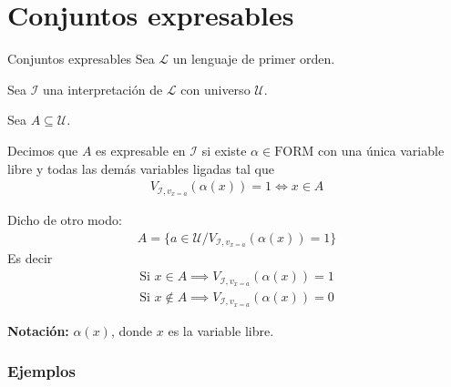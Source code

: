 \section{Conjuntos expresables}

\begin{definicion}{Conjuntos expresables}{}
    Sea $\mathcal{L}$ un lenguaje de primer orden.

    Sea $\mathcal{I}$ una interpretación de $\mathcal{L}$ con universo 
    $\mathcal{U}$.

    Sea $A \subseteq \mathcal{U}$.

    \medskip

    Decimos que $A$ es expresable en $\mathcal{I}$ si existe 
    $\alpha \in \mathrm{FORM}$ con una única  variable libre y todas las demás 
    variables ligadas tal que
    \begin{gather*}
        V_{\mathcal{I}, v_{x=a}} (\alpha(x)) = 1 \iff x \in A
    \end{gather*}

    \medskip

    Dicho de otro modo:
    \begin{gather*}
        A = \{ a \in \mathcal{U} / V_{\mathcal{I}, v_{x=a}} (\alpha(x))=1 \}
    \end{gather*}
    Es decir
    \begin{gather*}
        \text{Si } x \in A \implies V_{\mathcal{I}, v_{x=a}} (\alpha(x)) = 1\\
        \text{Si } x \notin A \implies V_{\mathcal{I}, v_{x=a}} (\alpha(x))=0
    \end{gather*}

    \bigskip
    \textbf{Notación:}
    $\alpha(x)$, donde $x$ es la variable libre.
\end{definicion}

\subsubsection{Ejemplos}


